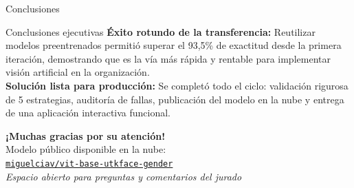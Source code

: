\documentclass[aspectratio=43,10pt]{beamer}
\newcommand{\RepoHuggingFaceUrl}{https://huggingface.co/miguelciav/vit-base-utkface-gender}
\newcommand{\RepoHuggingFaceTxt}{miguelciav/vit-base-utkface-gender}
\begin{document}
\begin{frame}{Conclusiones}
  \begin{block}{Conclusiones ejecutivas}
    \small
    \textbf{Éxito rotundo de la transferencia:} Reutilizar modelos preentrenados permitió superar el 93,5\% de exactitud desde la primera iteración, demostrando que es la vía más rápida y rentable para implementar visión artificial en la organización.\\[8pt]
    \textbf{Solución lista para producción:} Se completó todo el ciclo: validación rigurosa de 5 estrategias, auditoría de fallas, publicación del modelo en la nube y entrega de una aplicación interactiva funcional.
  \end{block}

  \vspace{0.4cm}
  \begin{center}
    {\Large \textbf{\color{ucvblue}¡Muchas gracias por su atención!}}\\[6pt]
    {\small Modelo público disponible en la nube:}\\[2pt]
    {\footnotesize \href{\RepoHuggingFaceUrl}{\texttt{\RepoHuggingFaceTxt}}}\\[8pt]
    {\small \textit{Espacio abierto para preguntas y comentarios del jurado}}
  \end{center}
\end{frame}
\end{document}
